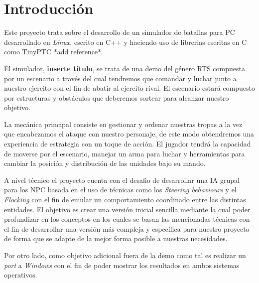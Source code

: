 \chapter{Introducción}

Este proyecto trata sobre el desarrollo de un simulador de batallas para \ac{PC}
desarrollado en \textit{Linux}, escrito en C++ y haciendo uso de librerias escritas en
C como TinyPTC *add reference*.

El simulador, \textbf{inserte título}, se trata de una demo del género \ac{RTS}
compuesta por un escenario a través del cual tendremos que comandar y luchar junto a
nuestro ejercito con el fin de abatir al ejercito rival. El escenario estará compuesto
por estructuras y obstáculos que deberemos sortear para alcanzar nuestro objetivo.

La mecánica principal consiste en gestionar y ordenar nuestras tropas a la vez
que encabezamos el ataque con nuestro personaje, de este modo obtendremos una
experiencia de estrategia con un toque de acción. El jugador tendrá la capacidad de
moverse por el escenario, manejar un arma para luchar y herramientas para cambiar la
posición y distribución de las unidades bajo su mando.

A nivel técnico el proyecto cuenta con el desafio de desarrollar una \ac{IA} grupal
para los \ac{NPC} basada en el uso de técnicas como los \textit{Steering behaviours} 
y el \textit{Flocking} con el fin de emular un comportamiento coordinado entre las
distintas entidades. El objetivo es crear una versión inicial sencilla mediante la 
cual poder profundizar en los conceptos en los cuales se basan las mencionadas técnicas
con el fin de desarrollar una versión más compleja y específica para nuestro proyecto
de forma que se adapte de la mejor forma posible a nuestras necesidades.

Por otro lado, como objetivo adicional fuera de la demo como tal es realizar
un \textit{port} a \textit{Windows} con el fin de poder mostrar los resultados
en ambos sistemas operativos.



